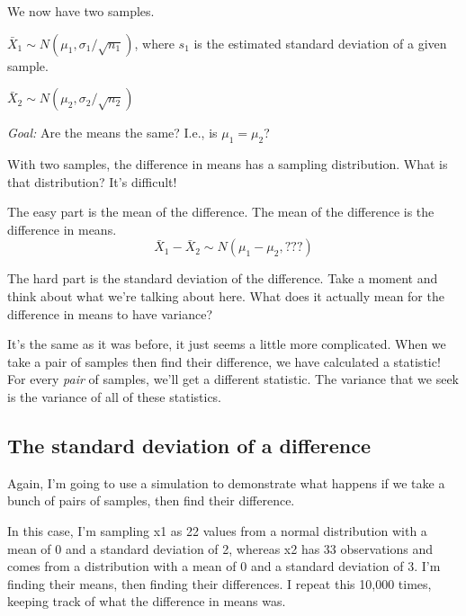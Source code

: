 \documentclass[
  letterpaper,
  DIV=11,
  numbers=noendperiod]{scrreprt}
\def\pause{}
\begin{document}
We now have two samples.

\(\bar X_1\sim N(\mu_1, \sigma_1/\sqrt{n_1})\), where \(s_1\) is the
estimated standard deviation of a given sample.

\(\bar X_2\sim N(\mu_2, \sigma_2/\sqrt{n_2})\) \pause

\quad

\emph{Goal:} Are the means the same? I.e., is \(\mu_1 = \mu_2\)?

With two samples, the difference in means has a sampling distribution.
What is that distribution? It's difficult!

The easy part is the mean of the difference. The mean of the difference
is the difference in means. \[
\bar X_1 - \bar X_2 \sim N(\mu_1 - \mu_2, ???)
\]

The hard part is the standard deviation of the difference. Take a moment
and think about what we're talking about here. What does it actually
mean for the difference in means to have variance?

It's the same as it was before, it just seems a little more complicated.
When we take a pair of samples then find their difference, we have
calculated a statistic! For every \emph{pair} of samples, we'll get a
different statistic. The variance that we seek is the variance of all of
these statistics.

\hypertarget{the-standard-deviation-of-a-difference}{%
\subsection{The standard deviation of a
difference}\label{the-standard-deviation-of-a-difference}}

Again, I'm going to use a simulation to demonstrate what happens if we
take a bunch of pairs of samples, then find their difference.

In this case, I'm sampling x1 as 22 values from a normal distribution
with a mean of 0 and a standard deviation of 2, whereas x2 has 33
observations and comes from a distribution with a mean of 0 and a
standard deviation of 3. I'm finding their means, then finding their
differences. I repeat this 10,000 times, keeping track of what the
difference in means was.
\end{document}
